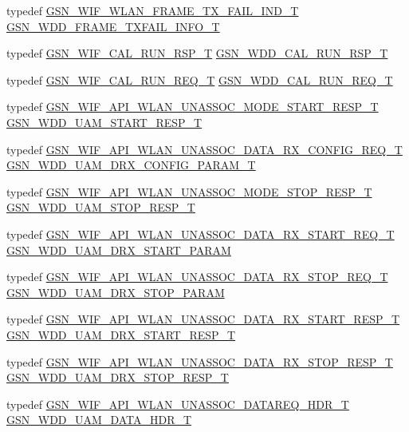 \begin{DoxyCompactItemize}
\item 
typedef \hyperlink{a00382}{GSN\_\-WIF\_\-WLAN\_\-FRAME\_\-TX\_\-FAIL\_\-IND\_\-T} \hyperlink{a00603_abf86a06ce9b3aa862dc938b896b11ca6}{GSN\_\-WDD\_\-FRAME\_\-TXFAIL\_\-INFO\_\-T}
\item 
typedef \hyperlink{a00320}{GSN\_\-WIF\_\-CAL\_\-RUN\_\-RSP\_\-T} \hyperlink{a00603_ae439d00fb6368eda8ceae5f7bbae3b95}{GSN\_\-WDD\_\-CAL\_\-RUN\_\-RSP\_\-T}
\item 
typedef \hyperlink{a00319}{GSN\_\-WIF\_\-CAL\_\-RUN\_\-REQ\_\-T} \hyperlink{a00603_a02ee63c44fe251b49941f6fc917aa922}{GSN\_\-WDD\_\-CAL\_\-RUN\_\-REQ\_\-T}
\item 
typedef \hyperlink{a00316}{GSN\_\-WIF\_\-API\_\-WLAN\_\-UNASSOC\_\-MODE\_\-START\_\-RESP\_\-T} \hyperlink{a00603_a42d71a0411d0f941e080667bdb171e95}{GSN\_\-WDD\_\-UAM\_\-START\_\-RESP\_\-T}
\item 
typedef \hyperlink{a00306}{GSN\_\-WIF\_\-API\_\-WLAN\_\-UNASSOC\_\-DATA\_\-RX\_\-CONFIG\_\-REQ\_\-T} \hyperlink{a00603_a556da70b3c2eaafd2f4893880bd4466a}{GSN\_\-WDD\_\-UAM\_\-DRX\_\-CONFIG\_\-PARAM\_\-T}
\item 
typedef \hyperlink{a00317}{GSN\_\-WIF\_\-API\_\-WLAN\_\-UNASSOC\_\-MODE\_\-STOP\_\-RESP\_\-T} \hyperlink{a00603_a80285c8663f782eba22ba3a5f4d39b38}{GSN\_\-WDD\_\-UAM\_\-STOP\_\-RESP\_\-T}
\item 
typedef \hyperlink{a00310}{GSN\_\-WIF\_\-API\_\-WLAN\_\-UNASSOC\_\-DATA\_\-RX\_\-START\_\-REQ\_\-T} \hyperlink{a00603_a898a4dd61cb26c0d7b242632369c8585}{GSN\_\-WDD\_\-UAM\_\-DRX\_\-START\_\-PARAM}
\item 
typedef \hyperlink{a00312}{GSN\_\-WIF\_\-API\_\-WLAN\_\-UNASSOC\_\-DATA\_\-RX\_\-STOP\_\-REQ\_\-T} \hyperlink{a00603_a82650badd5df3ae66988f45fd22b5434}{GSN\_\-WDD\_\-UAM\_\-DRX\_\-STOP\_\-PARAM}
\item 
typedef \hyperlink{a00311}{GSN\_\-WIF\_\-API\_\-WLAN\_\-UNASSOC\_\-DATA\_\-RX\_\-START\_\-RESP\_\-T} \hyperlink{a00603_a033e778f5ece6db55afcb7f609e15815}{GSN\_\-WDD\_\-UAM\_\-DRX\_\-START\_\-RESP\_\-T}
\item 
typedef \hyperlink{a00313}{GSN\_\-WIF\_\-API\_\-WLAN\_\-UNASSOC\_\-DATA\_\-RX\_\-STOP\_\-RESP\_\-T} \hyperlink{a00603_a0114b1685f0227b6028a08964c5b0cbd}{GSN\_\-WDD\_\-UAM\_\-DRX\_\-STOP\_\-RESP\_\-T}
\item 
typedef \hyperlink{a00314}{GSN\_\-WIF\_\-API\_\-WLAN\_\-UNASSOC\_\-DATAREQ\_\-HDR\_\-T} \hyperlink{a00603_a546688b4be1df3aa4ddbf6a63db0d3d5}{GSN\_\-WDD\_\-UAM\_\-DATA\_\-HDR\_\-T}
\item 

\end{DoxyCompactItemize}
